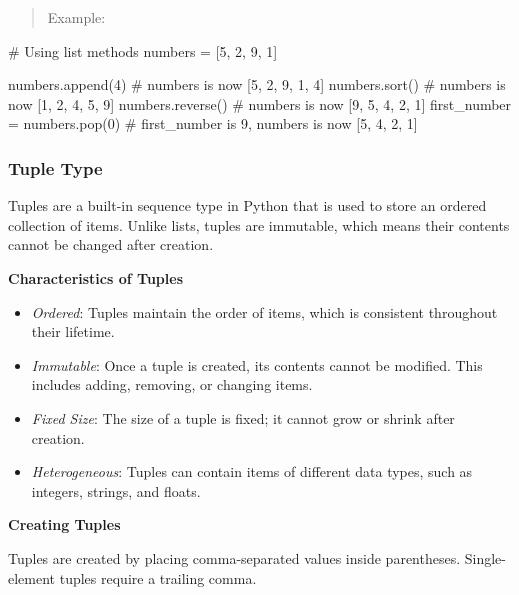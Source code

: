 \documentclass[
  letterpaper,
  DIV=11,
  numbers=noendperiod]{scrreprt}
\newenvironment{Shaded}{\begin{snugshade}}{\end{snugshade}}
\newcommand{\CommentTok}[1]{\textcolor[rgb]{0.37,0.37,0.37}{#1}}
\newcommand{\DecValTok}[1]{\textcolor[rgb]{0.68,0.00,0.00}{#1}}
\newcommand{\NormalTok}[1]{\textcolor[rgb]{0.00,0.23,0.31}{#1}}
\newcommand{\OperatorTok}[1]{\textcolor[rgb]{0.37,0.37,0.37}{#1}}
\providecommand{\tightlist}{%
  \setlength{\itemsep}{0pt}\setlength{\parskip}{0pt}}\usepackage{longtable,booktabs,array}
\theoremstyle{plain}
\theoremstyle{definition}
\theoremstyle{remark}
\begin{document}
\begin{quote}
Example:
\end{quote}

\begin{Shaded}
\begin{Highlighting}[]
\CommentTok{\# Using list methods}
\NormalTok{numbers }\OperatorTok{=}\NormalTok{ [}\DecValTok{5}\NormalTok{, }\DecValTok{2}\NormalTok{, }\DecValTok{9}\NormalTok{, }\DecValTok{1}\NormalTok{]}

\NormalTok{numbers.append(}\DecValTok{4}\NormalTok{)     }\CommentTok{\# numbers is now [5, 2, 9, 1, 4]}
\NormalTok{numbers.sort()        }\CommentTok{\# numbers is now [1, 2, 4, 5, 9]}
\NormalTok{numbers.reverse()     }\CommentTok{\# numbers is now [9, 5, 4, 2, 1]}
\NormalTok{first\_number }\OperatorTok{=}\NormalTok{ numbers.pop(}\DecValTok{0}\NormalTok{)  }\CommentTok{\# first\_number is 9, numbers is now [5, 4, 2, 1]}
\end{Highlighting}
\end{Shaded}

\subsubsection{Tuple Type}\label{tuple-type}

Tuples are a built-in sequence type in Python that is used to store an
ordered collection of items. Unlike lists, tuples are immutable, which
means their contents cannot be changed after creation.

\textbf{Characteristics of Tuples}

\begin{itemize}
\tightlist
\item
  \emph{Ordered}: Tuples maintain the order of items, which is
  consistent throughout their lifetime.
\item
  \emph{Immutable}: Once a tuple is created, its contents cannot be
  modified. This includes adding, removing, or changing items.
\item
  \emph{Fixed Size}: The size of a tuple is fixed; it cannot grow or
  shrink after creation.
\item
  \emph{Heterogeneous}: Tuples can contain items of different data
  types, such as integers, strings, and floats.
\end{itemize}

\textbf{Creating Tuples}

Tuples are created by placing comma-separated values inside parentheses.
Single-element tuples require a trailing comma.
\end{document}

